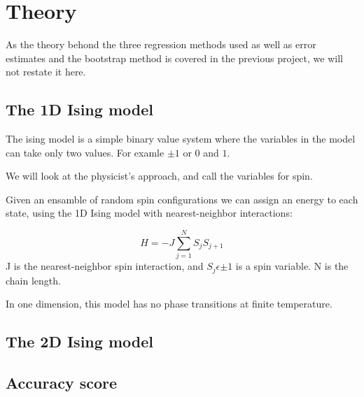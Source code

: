 \section{Theory}


As the theory behond the three regression methods used as well as error 
estimates and the bootstrap method is covered in the previous 
project, we will not restate it here. 

\subsection{The 1D Ising model} 
The ising model is a simple binary value system where the variables
in the model can take only two values. For examle \(\pm 1\) or \(0\) and \(1\). 
~\cite{Project2} 

We will look at the physicist's approach, and call the variables for spin.
~\cite{Project2}

Given an ensamble of random spin configurations we can assign an energy to
each state, using the 1D Ising model with nearest-neighbor interactions: 

\begin{equation}
	H = -J\sum\limits_{j=1}^N S_jS_{j+1} 
\end{equation}
J is the nearest-neighbor spin interaction, and \(S_j \epsilon {\pm 1}\) is a 
spin variable. N is the chain length. 
~\cite{HighBias}~\cite{Project2} 

In one dimension, this model has no phase transitions at finite temperature.
~\cite{Project2} 


\subsection{The 2D Ising model}

\subsection{Accuracy score} 





